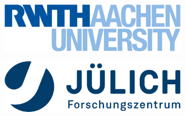 \vspace{250pt} %
\begin{figure}[h]
    \centering
    \begin{subfigure}{0.45\textwidth}
        \centering
        \includegraphics[width=\textwidth]{rwthlogo.png}
    \end{subfigure}
    \hfill
    \begin{subfigure}{0.45\textwidth}
        \centering
        \includegraphics[width=\textwidth]{jülichlogo.png}
    \end{subfigure}
\end{figure}